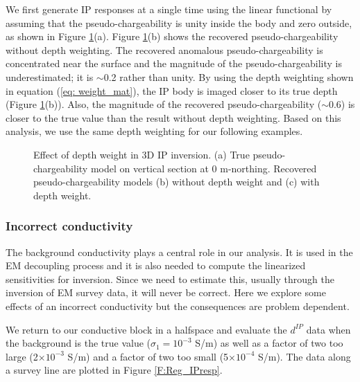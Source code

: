 \documentclass[extra,mreferee]{gji}
\newcommand{\dip}{d^{IP}}
\begin{document}
We first generate IP responses at a single time using the linear functional by assuming that the pseudo-chargeability is unity inside the body and zero outside, as shown in  Figure \ref{F:Depthweight}(a). 
Figure \ref{F:Depthweight}(b) shows the recovered pseudo-chargeability without depth weighting. 
The recovered anomalous pseudo-chargeability is concentrated  near the surface and the magnitude of the pseudo-chargeability is underestimated; it is $\sim$0.2 rather than unity. 
By using the depth weighting shown in equation (\ref{eq: weight_mat}),  the IP body is imaged closer to its true depth (Figure \ref{F:Depthweight}(b)). 
Also, the magnitude of the recovered pseudo-chargeability ($\sim$0.6) is closer to the true value than the result without depth weighting. 
Based on this analysis, we use the same depth weighting for our  following examples. 

\begin{figure}
  \caption{Effect of depth weight in 3D IP inversion. (a) True pseudo-chargeability model on vertical section at 0 m-northing. Recovered pseudo-chargeability models (b) without depth weight and (c) with depth weight.}
  \label{F:Depthweight}
\end{figure}
\clearpage

\subsubsection{Incorrect conductivity}
The background conductivity plays a central role in our analysis. It is used in the EM decoupling process and it is also needed to compute the linearized sensitivities for inversion. Since we need to estimate this, usually through the inversion of EM survey data, it will never be correct. Here we explore some effects of an incorrect conductivity but  the consequences are problem dependent.

We return to our conductive block in a halfspace and evaluate the $\dip$ data when the background is the true value ($\sigma_1 = 10^{-3}$ S/m) as well as a factor of two too large (2$\times10^{-3}$ S/m) and a factor of two too small (5$\times10^{-4}$ S/m). The data along a survey line are plotted in Figure \ref{F:Reg_IPresp}.
\end{document}
